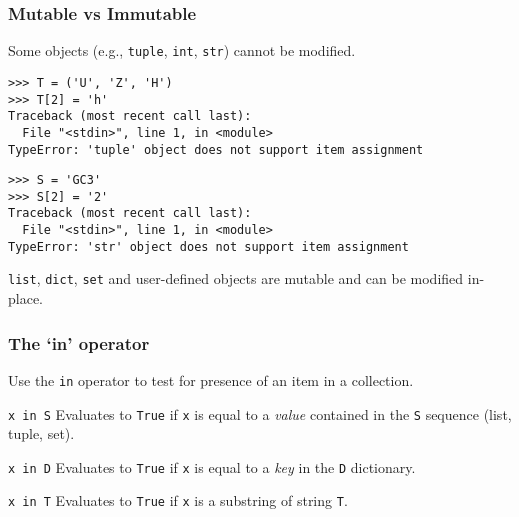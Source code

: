 \documentclass[english,serif,mathserif,xcolor=pdftex,dvipsnames,table]{beamer}
\begin{document}
\begin{frame}[fragile]
  \frametitle{Mutable vs Immutable}
  Some objects (e.g., \texttt{tuple}, \texttt{int}, \texttt{str})
  cannot be modified.
\begin{lstlisting}[basicstyle=\footnotesize\ttfamily]
>>> T = ('U', 'Z', 'H')
>>> T[2] = 'h'
Traceback (most recent call last):
  File "<stdin>", line 1, in <module>
TypeError: 'tuple' object does not support item assignment
\end{lstlisting}

\+
\begin{lstlisting}
>>> S = 'GC3'
>>> S[2] = '2'
Traceback (most recent call last):
  File "<stdin>", line 1, in <module>
TypeError: 'str' object does not support item assignment
\end{lstlisting}

  
  \+
  \texttt{list}, \texttt{dict}, \texttt{set} and user-defined objects
  are mutable and can be modified in-place.
\end{frame}


\begin{frame}[fragile]
  \frametitle{The `{\ttfamily\bfseries in}' operator}
  
  Use the \lstinline|in| operator to test for presence of an item in a
  collection.

  \begin{describe}{\lstinline|x in S|}
    Evaluates to \texttt{True} if \lstinline|x| is equal to a \emph{value}
    contained in the \lstinline|S| sequence (list, tuple, set).
  \end{describe}
  
  \begin{describe}{\lstinline|x in D|}
    Evaluates to \texttt{True} if \lstinline|x| is equal to a \emph{key}
    in the \lstinline|D| dictionary.
  \end{describe}
  
  \begin{describe}{\lstinline|x in T|}
    Evaluates to \texttt{True} if \lstinline|x| is a substring of
    string \lstinline|T|.
  \end{describe}
  
\end{frame}



\end{document}
